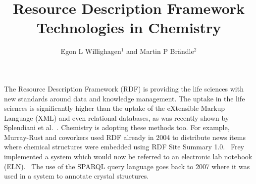 \documentclass[10pt]{bmc_article}
\newenvironment{bmcformat}{\begin{raggedright}\baselineskip20pt\sloppy\setboolean{publ}{false}}{\end{raggedright}\baselineskip20pt\sloppy}
\begin{document}
\begin{bmcformat}

\title{Resource Description Framework Technologies in Chemistry}
 
\author{Egon L Willighagen\correspondingauthor$^{1}$%
       and 
         Martin P Br\"andle$^2$%
      }

\address{%
    \iid(1)Division of Molecular Toxicology, Institute of Environmental Medicine, Karolinska Institutet, SE-17177 Stockholm, Sweden\\
    \iid(2)Chemistry Biology Pharmacy Information Center, ETH Z\"urich, Wolfgang-Pauli-Str. 10, 8093 Z\"urich, Switzerland
}%

\maketitle




The Resource Description Framework (RDF) is providing the life sciences with new standards
around data and knowledge management. The uptake in the life sciences is
significantly higher than the uptake of the eXtensible Markup Language (XML)
and even relational databases, as was recently shown by Splendiani et
al.~\cite{Splendiani2011}. Chemistry is adopting these methods too.
For example, Murray-Rust and coworkers used RDF already in 2004 to distribute
news items where chemical structures were embedded using RDF Site Summary 1.0.~\cite{MurrayRust2004}
Frey implemented a system which would now be referred to an
electronic lab notebook (ELN).~\cite{Frey2004} The use of the SPARQL
query language goes back to 2007 where it was used in a system to annotate
crystal structures.~\cite{Hunter2007}


\end{bmcformat}
\end{document}
